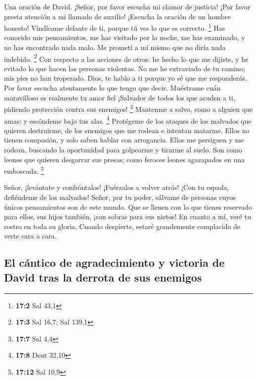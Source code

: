 Una oración de David.  ¡Señor, por favor escucha mi clamor
de justicia! ¡Por favor presta atención a mi llamado de auxilio!
¡Escucha la oración de un hombre honesto!  Vindícame delante
de ti, porque tú ves lo que es correcto. \footnote{\textbf{17:2} Sal
  43,1}  Has conocido mis pensamientos, me has visitado por
la noche, me has examinado, y no has encontrado nada malo. Me prometí a
mí mismo que no diría nada indebido. \footnote{\textbf{17:3} Sal 16,7;
  Sal 139,1}  Con respecto a las acciones de otros: he hecho
lo que me dijiste, y he evitado lo que hacen las personas violentas.
 No me he extraviado de tu camino; mis pies no han
tropezado.  Dios, te hablo a ti porque yo sé que me
responderás. Por favor escucha atentamente lo que tengo que decir.
 Muéstrame cuán maravilloso es realmente tu amor fiel
¡Salvador de todos los que acuden a ti, pidiendo protección contra sus
enemigos! \footnote{\textbf{17:7} Sal 4,4}  Mantenme a
salvo, como a alguien que amas; y escóndeme bajo tus alas. \footnote{\textbf{17:8}
  Deut 32,10}  Protégeme de los ataques de los malvados que
quieren destruirme, de los enemigos que me rodean e intentan matarme.
 Ellos no tienen compasión, y solo saben hablar con
arrogancia.  Ellos me persiguen y me rodean, buscando la
oportunidad para golpearme y tirarme al suelo.  Son como
leones que quieren desgarrar sus presas; como feroces leones agazapados
en una emboscada. \footnote{\textbf{17:12} Sal 10,9}

 Señor, ¡levántate y confróntalos! ¡Fuérzalos a volver
atrás! ¡Con tu espada, defiéndeme de los malvados!  Señor,
por tu poder, sálvame de personas cuyos únicos pensamientos son de este
mundo. Que se llenen con lo que tienes reservado para ellos, sus hijos
también, ¡con sobras para sus nietos!  En cuanto a mí, veré
tu rostro en toda su gloria. Cuando despierte, estaré grandemente
complacido de verte cara a cara.

\hypertarget{el-cuxe1ntico-de-agradecimiento-y-victoria-de-david-tras-la-derrota-de-sus-enemigos}{%
\subsection{El cántico de agradecimiento y victoria de David tras la
derrota de sus
enemigos}\label{el-cuxe1ntico-de-agradecimiento-y-victoria-de-david-tras-la-derrota-de-sus-enemigos}}


